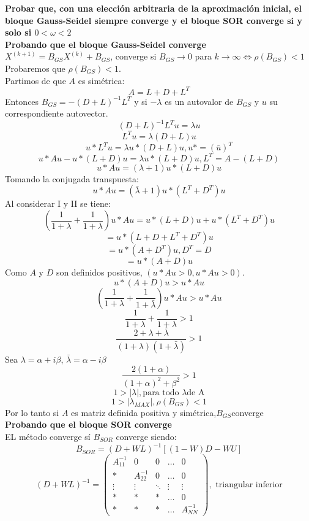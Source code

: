 \begin{itemize}
\textbf{Probar que, con una elección arbitraria de la aproximación inicial, el bloque Gauss-Seidel siempre converge y el bloque SOR converge si y solo si $0<\omega<2$}\\
\textbf{Probando que el bloque Gauss-Seidel converge}\\
$X^{(k+1)} = B_{GS}X^{(k)} + B_{GS}$, converge si $B_{GS}\rightarrow 0$ para $k \rightarrow \infty \Longleftrightarrow \rho(B_{GS})<1$
Probaremos que $\rho(B_{GS})<1$.\\
Partimos de que $A$ es  simétrica:\\
\[A=L+ D+ L^T\]
Entonces $B_{GS} = - (D+L)^{-1}L^T$ y si $-\lambda$ es un autovalor de $B_{GS}$ y $u$ su correspondiente autovector.
\[(D+L)^{-1}L^Tu = \lambda u\]
\[L^T u =\lambda(D+L)u\]
\[u*L^T u = \lambda u*(D+L)u, u*=( \bar{u})^T\]
\[u*Au - u*(L+D)u = \lambda u*(L+D)u, L^T = A-(L+D)\]
\[u*Au=(\lambda+1)u*(L+D)u\]
Tomando la conjugada transpuesta:
\[u*Au = ( \bar{\lambda} + 1)u*(L^T+D^T)u\]
Al considerar I y II se tiene:
\[(\frac{1}{1+\lambda}+\frac{1}{1+\lambda})u*Au=u*(L+D)u + u*(L^T+D^T)u\]
\[=u*(L+D+L^T+D^T)u\]
\[=u*(A+D^T)u , D^T =D\]
\[=u*(A+D)u\]
Como $A$ y $D$ son definidos positivos, $(u*Au > 0, u*Au>0)$.
\[u*(A+D)u > u*Au\]
\[(\frac{1}{1+\lambda}+\frac{1}{1+ \bar{\lambda}})u*Au > u*Au\]
\[\frac{1}{1+\lambda}+\frac{1}{1+\lambda} > 1\]
\[ \frac{2+\lambda + \bar{\lambda}}{(1+\lambda)(1+ \bar{\lambda})}> 1\]
Sea $\lambda=\alpha+i\beta $, $ \bar{\lambda}=\alpha-i \beta$
\[\frac{2(1+\alpha)}{(1+\alpha)^2 + \beta^2}>1\]
\[1 > |\lambda|, \text{para todo } \lambda \text{de A}\]
\[1 > |\lambda_{MAX}|, \rho(B_{GS})<1\]
Por lo tanto si $A$ es matriz definida positiva y simétrica,$B_{GS} $converge\\
\textbf{Probando que el bloque SOR converge}\\
EL método converge sí $B_{SOR} $ converge siendo:
\[B_{SOR}= (D+WL)^{-1}[(1-W)D - WU]\]
$$
    (D+WL)^{-1}=\begin{pmatrix}
      A_{11}^{-1} &  0 & 0 & \ldots &  0 \\
      * &  A_{22}^{-1} & 0 & \ldots &  0 \\
      \vdots & \vdots  & \ddots & \vdots & \vdots \\
      * &  *      & *      & \ldots &  0 \\
      * &  *      & *      & \ldots &  A_{N N}^{-1} 
    \end{pmatrix},\text{ triangular inferior}
$$


\end{itemize}
